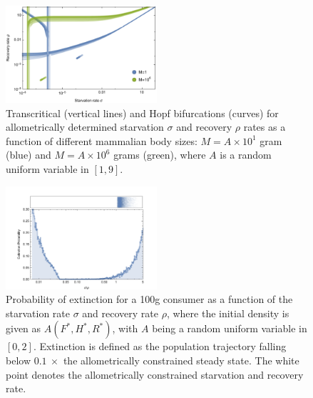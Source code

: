 \documentclass{pnastwo}
\begin{document}
\begin{figure}
\centering
\includegraphics[width=0.5\textwidth]{fig_DataHopf.pdf}
\caption{ Transcritical (vertical lines) and Hopf bifurcations (curves) for
  allometrically determined starvation $\sigma$ and recovery $\rho$ rates as
  a function of different mammalian body sizes: $M=A\times10^1$ gram (blue) and
  $M=A\times10^6$ grams (green), where $A$ is a random uniform variable in $[1,9]$.
  }
\label{fig:hopf}
\end{figure}

\begin{figure}
\centering
\includegraphics[width=0.5\textwidth]{fig_ExtinctionAllometric.pdf}
\caption{ Probability of extinction for a 100g consumer as a function of the starvation rate $\sigma$ and recovery rate $\rho$, where the initial density is given as $A(F^*,H^*,R^*)$, with
  $A$ being a random uniform variable in $[0,2]$.  Extinction is defined as the
  population trajectory falling below $0.1~\times$ the allometrically
  constrained steady state. The white point denotes the allometrically constrained starvation and recovery rate.}
\label{fig:ext}
\end{figure} 
 
\end{document}
